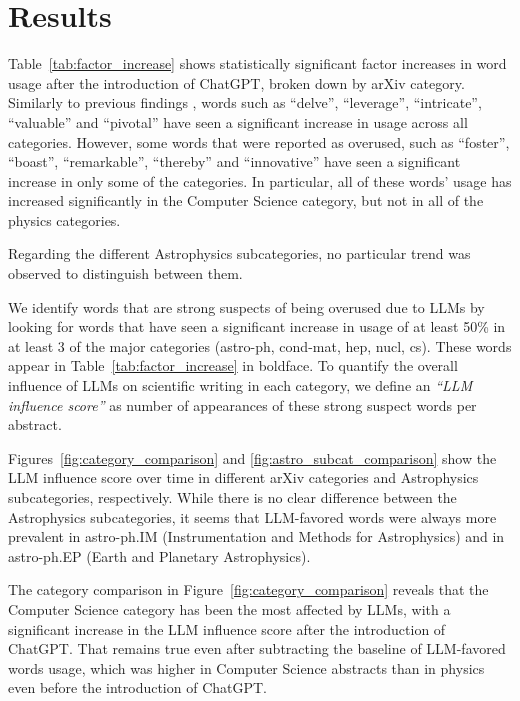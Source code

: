 \documentclass[twocolumn]{aastex701}
\begin{document}
\section{Results}

Table~\ref{tab:factor_increase} shows statistically significant factor increases in word usage after the introduction of ChatGPT, broken down by arXiv category.
Similarly to previous findings \citep{Juzek2024,Bao2025,Kobak2025}, words such as ``delve'', ``leverage'', ``intricate'', ``valuable'' and ``pivotal'' have seen a significant increase in usage across all categories.
However, some words that were reported as overused, such as ``foster'', ``boast'', ``remarkable'', ``thereby'' and ``innovative'' have seen a significant increase in only some of the categories.
In particular, all of these words' usage has increased significantly in the Computer Science category, but not in all of the physics categories.

Regarding the different Astrophysics subcategories, no particular trend was observed to distinguish between them.

We identify words that are strong suspects of being overused due to LLMs by looking for words that have seen a significant increase in usage of at least 50\% in at least 3 of the major categories (astro-ph, cond-mat, hep, nucl, cs).
These words appear in Table~\ref{tab:factor_increase} in boldface.
To quantify the overall influence of LLMs on scientific writing in each category, we define an \emph{``LLM influence score''} as number of appearances of these strong suspect words per abstract.

Figures~\ref{fig:category_comparison} and \ref{fig:astro_subcat_comparison} show the LLM influence score over time in different arXiv categories and Astrophysics subcategories, respectively.
While there is no clear difference between the Astrophysics subcategories, it seems that LLM-favored words were always more prevalent in astro-ph.IM (Instrumentation and Methods for Astrophysics) and in astro-ph.EP (Earth and Planetary Astrophysics).

The category comparison in Figure~\ref{fig:category_comparison} reveals that the Computer Science category has been the most affected by LLMs, with a significant increase in the LLM influence score after the introduction of ChatGPT.
That remains true even after subtracting the baseline of LLM-favored words usage, which was higher in Computer Science abstracts than in physics even before the introduction of ChatGPT.
\end{document}
